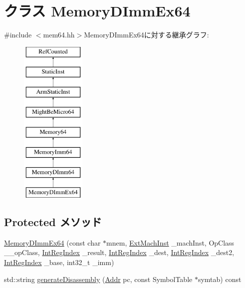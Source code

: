 \hypertarget{classArmISA_1_1MemoryDImmEx64}{
\section{クラス MemoryDImmEx64}
\label{classArmISA_1_1MemoryDImmEx64}
}


{\ttfamily \#include $<$mem64.hh$>$}MemoryDImmEx64に対する継承グラフ:\begin{figure}[H]
\begin{center}
\leavevmode
\includegraphics[height=8cm]{classArmISA_1_1MemoryDImmEx64}
\end{center}
\end{figure}
\subsection*{Protected メソッド}
\begin{DoxyCompactItemize}
\item 
\hyperlink{classArmISA_1_1MemoryDImmEx64_adf023173a245313ece4f1d6786897a94}{MemoryDImmEx64} (const char $\ast$mnem, \hyperlink{classStaticInst_a5605d4fc727eae9e595325c90c0ec108}{ExtMachInst} \_\-machInst, OpClass \_\-\_\-opClass, \hyperlink{namespaceArmISA_ae64680ba9fb526106829d6bf92fc791b}{IntRegIndex} \_\-result, \hyperlink{namespaceArmISA_ae64680ba9fb526106829d6bf92fc791b}{IntRegIndex} \_\-dest, \hyperlink{namespaceArmISA_ae64680ba9fb526106829d6bf92fc791b}{IntRegIndex} \_\-dest2, \hyperlink{namespaceArmISA_ae64680ba9fb526106829d6bf92fc791b}{IntRegIndex} \_\-base, int32\_\-t \_\-imm)
\item 
std::string \hyperlink{classArmISA_1_1MemoryDImmEx64_a95d323a22a5f07e14d6b4c9385a91896}{generateDisassembly} (\hyperlink{classm5_1_1params_1_1Addr}{Addr} pc, const SymbolTable $\ast$symtab) const 
\end{DoxyCompactItemize}
